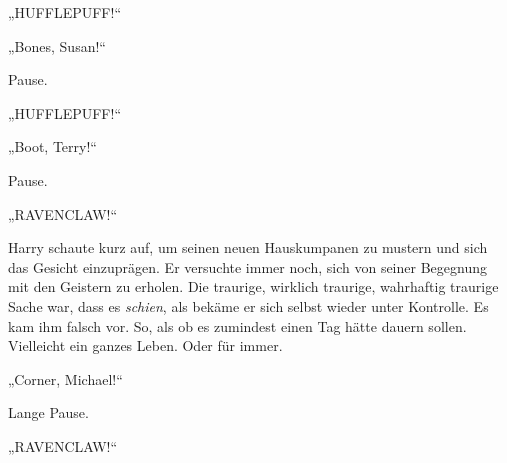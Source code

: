 „HUFFLEPUFF!“

„Bones, Susan!“

Pause.

„HUFFLEPUFF!“

„Boot, Terry!“

Pause.

„RAVENCLAW!“

Harry schaute kurz auf, um seinen neuen Hauskumpanen zu mustern und sich das Gesicht einzuprägen. Er versuchte immer noch, sich von seiner Begegnung mit den Geistern zu erholen. Die traurige, wirklich traurige, wahrhaftig traurige Sache war, dass es \emph{schien}, als bekäme er sich selbst wieder unter Kontrolle. Es kam ihm falsch vor. So, als ob es zumindest einen Tag hätte dauern sollen. Vielleicht ein ganzes Leben. Oder für immer.




„Corner, Michael!“

Lange Pause.

„RAVENCLAW!“

